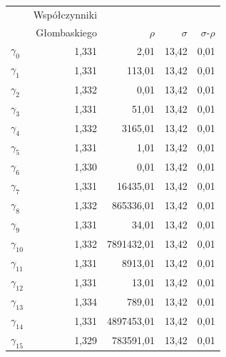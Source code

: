 \documentclass[licencjacka]{pracamgr}
\begin{document}
\begin{center}
  \begin{tabular}{lrrrr}
    & Współczynniki \\
    & Głombaskiego & $\rho$ & $\sigma$ & $\sigma$-$\rho$\\
    $\gamma_{0}$ & 1,331 & 2,01 & 13,42 & 0,01 \\
    $\gamma_{1}$ & 1,331 & 113,01 & 13,42 & 0,01 \\
    $\gamma_{2}$ & 1,332 & 0,01 & 13,42 & 0,01 \\
    $\gamma_{3}$ & 1,331 & 51,01 & 13,42 & 0,01 \\
    $\gamma_{4}$ & 1,332 & 3165,01 & 13,42 & 0,01 \\
    $\gamma_{5}$ & 1,331 & 1,01 & 13,42 & 0,01 \\
    $\gamma_{6}$ & 1,330 & 0,01 & 13,42 & 0,01 \\
    $\gamma_{7}$ & 1,331 & 16435,01 & 13,42 & 0,01 \\
    $\gamma_{8}$ & 1,332 & 865336,01 & 13,42 & 0,01 \\
    $\gamma_{9}$ & 1,331 & 34,01 & 13,42 & 0,01 \\
    $\gamma_{10}$ & 1,332 & 7891432,01 & 13,42 & 0,01 \\
    $\gamma_{11}$ & 1,331 & 8913,01 & 13,42 & 0,01 \\
    $\gamma_{12}$ & 1,331 & 13,01 & 13,42 & 0,01 \\
    $\gamma_{13}$ & 1,334 & 789,01 & 13,42 & 0,01 \\
    $\gamma_{14}$ & 1,331 & 4897453,01 & 13,42 & 0,01 \\
    $\gamma_{15}$ & 1,329 & 783591,01 & 13,42 & 0,01 \\
  \end{tabular}
\end{center}

\fi
\end{document}

